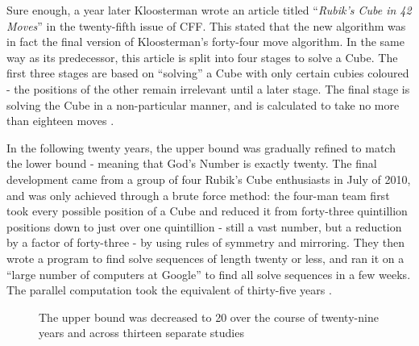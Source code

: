 \documentclass{report}
\newcommand{\tit}[1]{\textit{#1}}
\newcommand{\propernoun}[1]{\enquote{\tit{#1}}}
\begin{document}
    Sure enough, a year later Kloosterman wrote an article titled \propernoun{Rubik's Cube in 42 Moves} in the twenty-fifth issue of CFF. This stated that the new algorithm was in fact the final version of Kloosterman's forty-four move algorithm. In the same way as its predecessor, this article is split into four stages to solve a Cube. The first three stages are based on \enquote{solving} a Cube with only certain cubies coloured - the positions of the other remain irrelevant until a later stage. The final stage is solving the Cube in a non-particular manner, and is calculated to take no more than eighteen moves \cite{Kloosterman1990}.
    
    In the following twenty years, the upper bound was gradually refined to match the lower bound - meaning that God's Number is exactly twenty. The final development came from a group of four Rubik's Cube enthusiasts in July of 2010, and was only achieved through a brute force method: the four-man team first took every possible position of a Cube and reduced it from forty-three quintillion positions down to just over one quintillion - still a vast number, but a reduction by a factor of forty-three - by using rules of symmetry and mirroring. They then wrote a program to find solve sequences of length twenty or less, and ran it on a \enquote{large number of computers at Google} to find all solve sequences in a few weeks. The parallel computation took the equivalent of thirty-five years \cite{Rokicki2010}.
    
   	\begin{figure}[h]
    	\begin{center}
    		\caption{The upper bound was decreased to 20 over the course of twenty-nine years and across thirteen separate studies \cite{Rokicki2010}}
			\label{fig:godsnumbergraph}
		\end{center}
	\end{figure}
\end{document}

